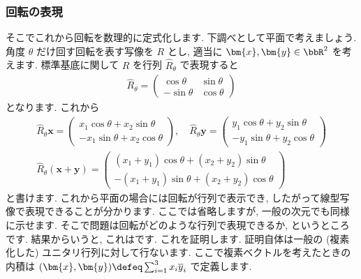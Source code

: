 \documentclass[openany, a4paper, oneside]{jsbook}
\begin{document}
\subsubsection{回転の表現}

そこでこれから回転を数理的に定式化します.
下調べとして平面で考えましょう.
角度 $\theta$ だけ回す回転を表す写像を $R$ とし, 適当に $\bm{x} , \bm{y} \in \bbR^2$ を考えます.
標準基底に関して $R$ を行列 $\hat{R}_{\theta}$ で表現すると
\begin{align}
    \hat{R} _{ \theta }
    =
    \begin{pmatrix}
        \cos \theta & \sin \theta \\
        -\sin \theta & \cos \theta
    \end{pmatrix}
\end{align}
となります.
これから
\begin{gather}
    \hat{R} _{ \theta } \bm{x}
    =
    \begin{pmatrix}
        x_1 \cos \theta + x_2 \sin \theta \\
        -x_1 \sin \theta + x_2 \cos \theta
    \end{pmatrix}
    , \quad
    \hat{R} _{ \theta } \bm{y}
    =
    \begin{pmatrix}
        y_1 \cos \theta + y_2 \sin \theta \\
        -y_1 \sin \theta + y_2 \cos \theta
    \end{pmatrix} \\
    \hat{R} _{ \theta } ( \bm{x} + \bm{y} )
    =
    \begin{pmatrix}
        ( x_1 + y_1 ) \cos \theta + (x_2 + y_2) \sin \theta \\
        -( x_1 + y_1 ) \sin \theta + ( x_2 + y_2 ) \cos \theta
    \end{pmatrix}
\end{gather}
と書けます.
これから平面の場合には回転が行列で表示でき, したがって線型写像で表現できることが分かります.
ここでは省略しますが, 一般の次元でも同様に示せます.
そこで問題は回転がどのような行列で表現できるか, というところです.
結果からいうと, これはです.
これを証明します.
証明自体は一般の (複素化した) ユニタリ行列に対して行ないます.
ここで複素ベクトルを考えたときの内積は $( \bm{x} , \bm{y} ) \defeq \sum_{i=1}^3 x_i \overline{y}_i$
で定義します.
\end{document}
